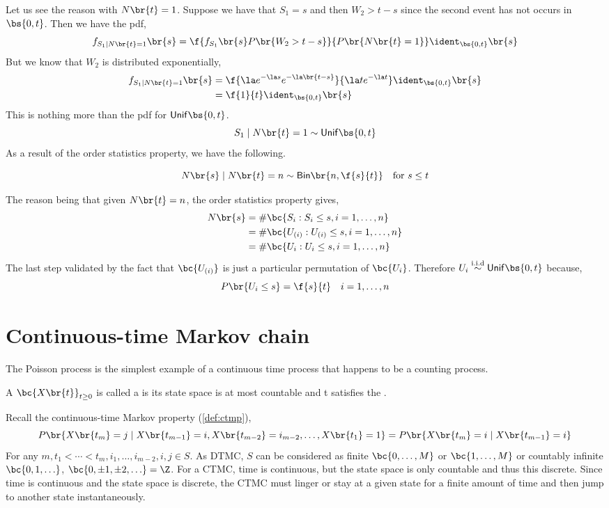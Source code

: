 \documentclass{article}
\newcommand{\Bi}{\mathsf{Bin}}
\newcommand{\Unif}{\mathsf{Unif}}
\begin{document}
    Let us see the reason with $N\br{t} = 1$. Suppose we have that $S_1 = s$ and then $W_2 > t - s$ since the second event has not occurs in $\bs{0, t}$. Then we have the pdf,
    \[ f_{S_1 \mid N\br{t} = 1} \br{s} = \f{f_{S_1}\br{s} P\br{W_2 > t - s}}{P\br{N\br{t} = 1}} \ident_{\bs{0, t}}\br{s} \]
    But we know that $W_2$ is distributed exponentially,
    \begin{align*}
    f_{S_1 \mid N\br{t} = 1} \br{s}
    &= \f{ \la e^{-\la s} e^{-\la\br{t - s}}}{\la t e^{-\la t}} \ident_{\bs{0, t}}\br{s} \\
    &= \f{1}{t}\ident_{\bs{0, t}}\br{s}
    \end{align*}
    This is nothing more than the pdf for $\Unif\bs{0, t}$.
    \[ S_1 \mid N\br{t} = 1 \sim \Unif\bs{0, t} \]
    As a result of the order statistics property, we have the following.
    \begin{theorem}
        \[ N\br{s} \mid N\br{t} = n \sim \Bi\br{n, \f{s}{t}} \quad \text{for } s \leq t\]
    \end{theorem}
    The reason being that given $N\br{t} = n$, the order statistics property gives,
    \begin{align*}
        N\br{s}
        &= \# \bc{S_i : S_i \leq s, i = 1, \ldots, n} \\
        &= \# \bc{U_{(i)} : U_{(i)} \leq s, i = 1, \ldots, n} \\
        &= \# \bc{U_{i} : U_{i} \leq s, i = 1, \ldots, n}
    \end{align*}
    The last step validated by the fact that $\bc{U_{(i)}}$ is just a particular permutation of $\bc{U_{i}}$. Therefore $U_i \stackrel{\text{i.i.d}}{\sim} \Unif\bs{0, t}$ because,
    \[ P\br{U_i \leq s} = \f{s}{t} \quad i = 1, \ldots, n \]

    \section{Continuous-time Markov chain}

    The Poisson process is the simplest example of a continuous time process that happens to be a counting process.
    \begin{definition}
        A  $\bc{X\br{t}}_{t \geq 0}$ is called a  is its state space is at most countable and t satisfies the .
    \end{definition}
    Recall the continuous-time Markov property (\cref{def:ctmp}),
    \[ P\br{X\br{t_m} = j \mid X\br{t_{m-1}} = i, X\br{t_{m-2}} = i_{m-2}, \ldots, X\br{t_1} = 1} = P\br{X\br{t_{m}} = i \mid X\br{t_{m-1}} = i} \]
    For any $m, t_1 < \cdots < t_m, i_1, \ldots, i_{m-2}, i, j \in S$. As DTMC, $S$ can be considered as finite $\bc{0, \ldots, M}$ or $\bc{1, \ldots, M}$ or countably infinite $\bc{0, 1, \ldots}$, $\bc{0, \pm 1, \pm 2, \ldots} = \Z$. For a CTMC, time is continuous, but the state space is only countable and thus this discrete. Since time is continuous and the state space is discrete, the CTMC must linger or stay at a given state for a finite amount of time and then jump to another state instantaneously.
\end{document}
